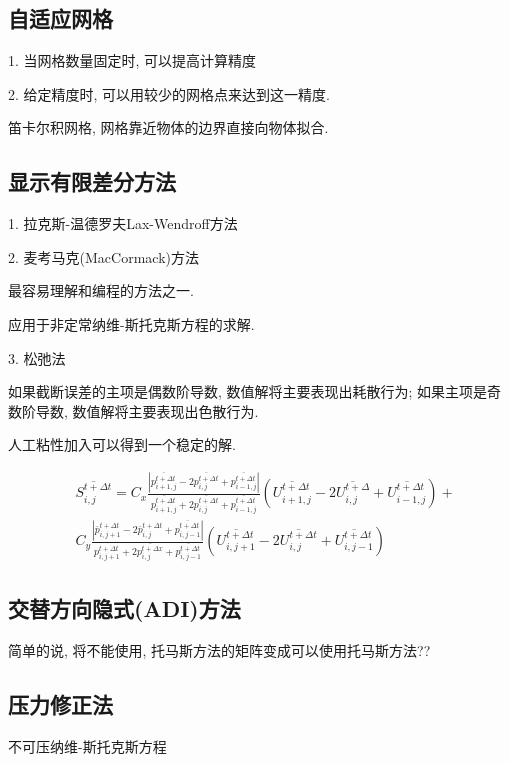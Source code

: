 \documentclass[UTF8]{ctexart}
\begin{document}
\subsection{自适应网格}
1. 当网格数量固定时, 可以提高计算精度

2. 给定精度时, 可以用较少的网格点来达到这一精度.

笛卡尔积网格, 网格靠近物体的边界直接向物体拟合.


\subsection{显示有限差分方法}
1. 拉克斯-温德罗夫Lax-Wendroff方法

2. 麦考马克(MacCormack)方法

最容易理解和编程的方法之一.

应用于非定常纳维-斯托克斯方程的求解.

3. 松弛法

如果截断误差的主项是偶数阶导数, 数值解将主要表现出耗散行为; 如果主项是奇数阶导数, 数值解将主要表现出色散行为.

人工粘性加入可以得到一个稳定的解.



$$
	\begin{aligned}
		 & \overline{S_{i, j}^{t+\Delta t}}=C_{x} \frac{\left|\overline{p_{i+1, j}^{t+\Delta t}}-2 \overline{p_{i, j}^{t+\Delta t}}+\overline{p_{i-1, j}^{t+\Delta t}}\right|}{\overline{p_{i+1, j}^{t+\Delta t}}+2 \overline{p_{i, j}^{t+\Delta t}}+\overline{p_{i-1, j}^{t+\Delta t}}}\left(\overline{U_{i+1, j}^{t+\Delta t}}-2 \overline{U_{i, j}^{t+\Delta}}+\overline{U_{i-1, j}^{t+\Delta t}}\right)+ \\
		 & C_{y} \frac{\left|\bar{p}_{i, j+1}^{t+\Delta t}-2 \bar{p}_{i, j}^{t+\Delta t}+\overline{p_{i, j-1}^{t+\Delta t}}\right|}{p_{i, j+1}^{t+\Delta t}+2 \overline{p_{i, j}^{t+\Delta x}}+\overline{p_{i, j-1}^{t+\Delta t}}}\left(\overline{U_{i, j+1}^{t+\Delta t}}-2 \overline{U_{i, j}^{t+\Delta t}}+\overline{U_{i, j-1}^{t+\Delta t}}\right)
	\end{aligned}
$$
\subsection{交替方向隐式(ADI)方法}


简单的说, 将不能使用, 托马斯方法的矩阵变成可以使用托马斯方法??

\subsection{压力修正法}
不可压纳维-斯托克斯方程
\end{document}
